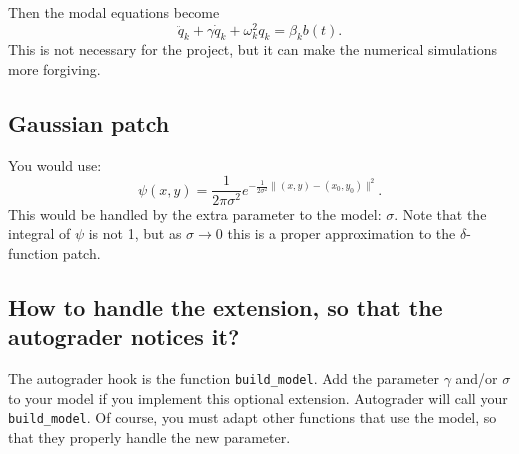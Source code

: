 \documentclass[11pt]{article}
\begin{document}
Then the modal equations become
\[
\ddot q_k + \gamma \dot q_k + \omega_k^2 q_k = \beta_k b(t).
\]
This is not necessary for the project, but it can make the numerical 
simulations more forgiving.

\subsection{ Gaussian patch}
You would use:
\[ \psi(x,y) = \frac{1}{2\pi\sigma^2} e^{-\frac{1}{2\sigma^2} \|(x,y)-(x_0,y_0)\|^2}. \]
This would be handled by the extra parameter to the model: \( \sigma \).
Note that the integral of \(\psi\) is not 1, but as \(\sigma\to 0\) this is
a proper approximation to the \(\delta\)-function patch.


\subsection{How to handle the extension, so that the autograder notices it?}
The autograder hook is the function \texttt{build\_model}. Add the
parameter \(\gamma\) and/or \(\sigma\) to your model if you implement
this optional extension.  Autograder will call your
\texttt{build\_model}. Of course, you must adapt other functions that
use the model, so that they properly handle the new parameter.
\end{document}
